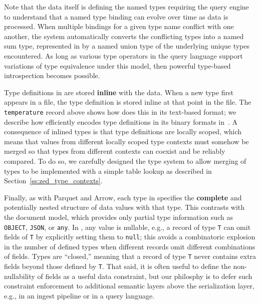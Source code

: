 Note that the data itself is defining the named types requiring the query engine to understand that a named type binding can evolve over time as data is processed.  When multiple bindings for a given type name conflict with one another, the system automatically converts the conflicting types into a named sum type, represented in \sys{} by a named union type of the underlying unique types encountered.  As long as various type operators in the query language support variations of type equivalence under this model, then powerful type-based introspection becomes possible. 

Type definitions in \sys{} are stored {\bf inline} with the data. When a new type first appears in a \sys{} file, the type definition is stored inline at that point in the file. The \texttt{temperature} record above shows how \sys{} does this in its text-based format; we describe  how \sys{} efficiently encodes type definitions in its binary formats in~. A consequence of inlined types is that type definitions are locally scoped, which means that values from different locally scoped type contexts must somehow be merged so that types from different contexts can coexist and be reliably compared. To do so, we carefully designed the \sys{} type system to allow merging of types to be implemented with a simple table lookup as described in Section~\ref{ss:zed_type_contexts}.

Finally, as with Parquet and Arrow, each type in \sys{} specifies the {\bf complete} and potentially nested structure of data values with that type. This contrasts with the document model, which provides only partial type information such as \texttt{OBJECT}, \texttt{JSON}, or \texttt{any}. In \sys{}, any value is nullable, e.g., a record of type \texttt{T} can omit fields of \texttt{T} by explicitly setting them to \texttt{null}; this avoids a combinatoric explosion in the number of defined types when different records omit different combinations of fields. Types are ``closed,'' meaning that a record of type \texttt{T} never contains extra fields beyond those defined by \texttt{T}.  That said, it is often useful to define the non-nullability of fields as a useful data constraint, but our philosphy is to defer such constraint enforcement to additional semantic layers above the \sys{} serialization layer, e.g., in an ingest pipeline or in a query language.

